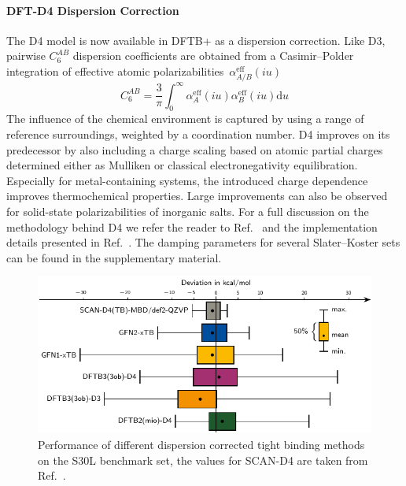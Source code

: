 \documentclass{revtex4-1}
\newcommand{\dftbp}{DFTB+}
\begin{document}
\paragraph{DFT-D4 Dispersion Correction}
The D4 model\cite{caldeweyher2017,caldeweyher2019} is now available in \dftbp{} as
a dispersion correction. Like D3, pairwise $C_6^{AB}$ dispersion coefficients
are obtained from a Casimir--Polder integration of effective atomic
polarizabilities~$\alpha_{A/B}^\text{eff}(iu)$
%
\begin{equation}
  \label{eq:casimir-polder}
  C_6^{AB} = \frac3\pi\int^\infty_0 \alpha_A^\text{eff}(iu)\alpha_B^\text{eff}(iu)
  \mathrm{d}u
\end{equation}
%
The influence of the chemical environment is captured by using a range of
reference surroundings, weighted by a coordination number.  D4 improves on its
predecessor by also including a charge scaling based on atomic partial charges
determined either as Mulliken\cite{caldeweyher2017} or classical
electronegativity equilibration.\cite{caldeweyher2019} Especially for
metal-containing systems, the introduced charge dependence improves
thermochemical properties.\cite{bursch2019} Large improvements can also be
observed for solid-state polarizabilities of inorganic
salts.\cite{caldeweyher2020} For a full discussion on the methodology behind D4
we refer the reader to Ref.~ and the implementation
details presented in Ref.~. The damping parameters
for several Slater--Koster sets can be found in the supplementary material.
\begin{figure}[htbp]
  \includegraphics[width=\textwidth]{figures/s30l-boxplot.pdf}
  \caption{\label{fig:d4-s30l} Performance of different dispersion corrected
    tight binding methods on the S30L benchmark set, the values for SCAN-D4 are
    taken from Ref.~.}
\end{figure}
\end{document}
